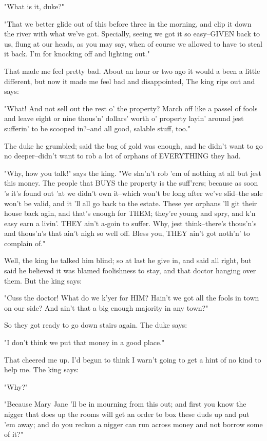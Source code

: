 "What is it, duke?"

"That we better glide out of this before three in the morning, and clip
it down the river with what we've got.  Specially, seeing we got it so
easy--GIVEN back to us, flung at our heads, as you may say, when of
course we allowed to have to steal it back.  I'm for knocking off and
lighting out."

That made me feel pretty bad.  About an hour or two ago it would a been a
little different, but now it made me feel bad and disappointed, The king
rips out and says:

"What!  And not sell out the rest o' the property?  March off like a
passel of fools and leave eight or nine thous'n' dollars' worth o'
property layin' around jest sufferin' to be scooped in?--and all good,
salable stuff, too."

The duke he grumbled; said the bag of gold was enough, and he didn't want
to go no deeper--didn't want to rob a lot of orphans of EVERYTHING they
had.

"Why, how you talk!" says the king.  "We sha'n't rob 'em of nothing at
all but jest this money.  The people that BUYS the property is the
suff'rers; because as soon 's it's found out 'at we didn't own it--which
won't be long after we've slid--the sale won't be valid, and it 'll all
go back to the estate.  These yer orphans 'll git their house back agin,
and that's enough for THEM; they're young and spry, and k'n easy earn a
livin'.  THEY ain't a-goin to suffer.  Why, jest think--there's thous'n's
and thous'n's that ain't nigh so well off.  Bless you, THEY ain't got
noth'n' to complain of."

Well, the king he talked him blind; so at last he give in, and said all
right, but said he believed it was blamed foolishness to stay, and that
doctor hanging over them.  But the king says:

"Cuss the doctor!  What do we k'yer for HIM?  Hain't we got all the fools
in town on our side?  And ain't that a big enough majority in any town?"

So they got ready to go down stairs again.  The duke says:

"I don't think we put that money in a good place."

That cheered me up.  I'd begun to think I warn't going to get a hint of
no kind to help me.  The king says:

"Why?"

"Because Mary Jane 'll be in mourning from this out; and first you know
the nigger that does up the rooms will get an order to box these duds up
and put 'em away; and do you reckon a nigger can run across money and not
borrow some of it?"


